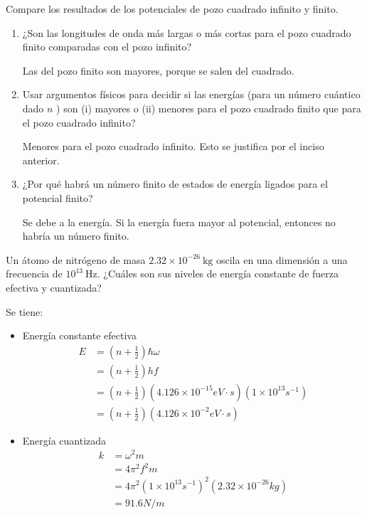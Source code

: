 \begin{problema}
    Compare los resultados de los potenciales de pozo cuadrado infinito y finito.
    \begin{enumerate}
        \item ¿Son las longitudes de onda más largas o más cortas para el pozo cuadrado finito comparadas con el pozo infinito?
        \begin{sol}
            Las del pozo finito son mayores, porque se salen del cuadrado. 
        \end{sol}
        \item Usar argumentos físicos para decidir si las energías (para un número cuántico dado $n$ ) son (i) mayores o (ii) menores para el pozo cuadrado finito que para el pozo cuadrado infinito?
        \begin{sol}
            Menores para el pozo cuadrado infinito. Esto se justifica por el inciso anterior. 
        \end{sol}
        \item ¿Por qué habrá un número finito de estados de energía ligados para el potencial finito?
        \begin{sol}
            Se debe a la energía. Si la energía fuera mayor al potencial, entonces no habría un número finito. 
        \end{sol}
    \end{enumerate}
      

\end{problema}

\begin{problema}
    Un átomo de nitrógeno de masa $2.32 \times 10^{-26} \mathrm{~kg}$ oscila en una dimensión a una frecuencia de $10^{13} \mathrm{~Hz}$. ¿Cuáles son sus niveles de energía constante de fuerza efectiva y cuantizada?
    \begin{sol}
        Se tiene: 
        \begin{itemize}
            \item Energía constante efectiva
            \begin{align*}
                E &= \left(n+\frac{1}{2}\right)\hbar\omega\\
                   &= \left(n+\frac{1}{2}\right)hf\\
                   &= \left(n+\frac{1}{2}\right)(4.126\times 10^{-15}eV\cdot s)(1\times 10^{13} s^{-1})\\
                   &= \left(n+\frac{1}{2}\right)(4.126\times 10^{-2}eV\cdot s)
            \end{align*}
            \item Energía cuantizada
            \begin{align*}
                k &= \omega^2m\\
                &= 4\pi^2f^2m\\
                &= 4\pi^2\left(1\times 10^{13}s^{-1}\right)^2(2.32\times 10^{-26}kg)\\
                &= 91.6 N/m
            \end{align*}
        \end{itemize}
    \end{sol}
\end{problema}

